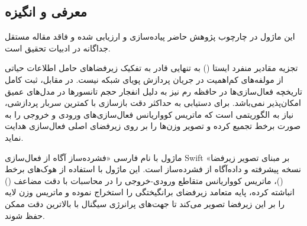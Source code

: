 \subsection{معرفی و انگیزه}
این ماژول در چارچوب پژوهش حاضر پیاده‌سازی و ارزیابی شده و فاقد مقاله مستقل جداگانه در ادبیات تحقیق است.

تجزیه مقادیر منفرد ایستا () به تنهایی قادر به تفکیک زیرفضاهای حامل اطلاعات حیاتی از مولفه‌های کم‌اهمیت در جریان پردازش پویای شبکه نیست. در مقابل، ثبت کامل تاریخچه فعال‌سازی‌ها در حافظه رم نیز به دلیل انفجار حجم تانسورها در مدل‌های عمیق امکان‌پذیر نمی‌باشد. برای دستیابی به حداکثر دقت بازسازی با کمترین سربار پردازشی، نیاز به الگوریتمی است که ماتریس کوواریانس فعال‌سازی‌های ورودی و خروجی را به صورت برخط تجمیع کرده و تصویر وزن‌ها را بر روی زیرفضای اصلی فعال‌سازی هدایت نماید.

ماژول  با نام فارسی «فشرده‌ساز آگاه از فعال‌سازی Swift بر مبنای تصویر زیرفضا» نسخه پیشرفته و داده‌آگاه از فشرده‌ساز  است. این ماژول با استفاده از هوک‌های برخط ()، ماتریس کوواریانس متقاطع ورودی-خروجی را در محاسبات با دقت مضاعف () انباشته کرده، پایه متعامد زیرفضای برانگیختگی را استخراج نموده و ماتریس وزن لایه را بر این زیرفضا تصویر می‌کند تا جهت‌های پرانرژی سیگنال با بالاترین دقت ممکن حفظ شوند.
